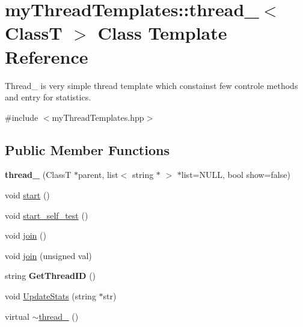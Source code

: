 \hypertarget{classmyThreadTemplates_1_1thread__1}{
\section{myThreadTemplates::thread\_$<$ ClassT $>$ Class Template Reference}
\label{classmyThreadTemplates_1_1thread__1}
}


Thread\_ is very simple thread template which constainst few controle methods and entry for statistics.  




{\ttfamily \#include $<$myThreadTemplates.hpp$>$}

\subsection*{Public Member Functions}
\begin{DoxyCompactItemize}
\item 
\hypertarget{classmyThreadTemplates_1_1thread__1_a5d23c11a3857a83282ae408c1066c311}{
{\bfseries thread\_} (ClassT $\ast$parent, list$<$ string $\ast$ $>$ $\ast$list=NULL, bool show=false)}
\label{classmyThreadTemplates_1_1thread__1_a5d23c11a3857a83282ae408c1066c311}

\item 
void \hyperlink{classmyThreadTemplates_1_1thread__1_a40dcf528dbb18b16ed44054451a575e1}{start} ()
\item 
void \hyperlink{classmyThreadTemplates_1_1thread__1_aaa171242d5355f2a472a566d30863894}{start\_\-self\_\-test} ()
\item 
void \hyperlink{classmyThreadTemplates_1_1thread__1_ae393ee33ecbfee158a03a4c0f21cf95c}{join} ()
\item 
void \hyperlink{classmyThreadTemplates_1_1thread__1_a9a0372afc5bd30783dde8fed70df908c}{join} (unsigned val)
\item 
\hypertarget{classmyThreadTemplates_1_1thread__1_a415d33614fa9faf235c7ed0f189e4fc4}{
string {\bfseries GetThreadID} ()}
\label{classmyThreadTemplates_1_1thread__1_a415d33614fa9faf235c7ed0f189e4fc4}

\item 
void \hyperlink{classmyThreadTemplates_1_1thread__1_a2cd2286a9d51537395123832a6a25ebc}{UpdateStats} (string $\ast$str)
\item 
virtual \hyperlink{classmyThreadTemplates_1_1thread__1_aab0cedc80707090ec300be40e68c19c1}{$\sim$thread\_} ()
\end{DoxyCompactItemize}
